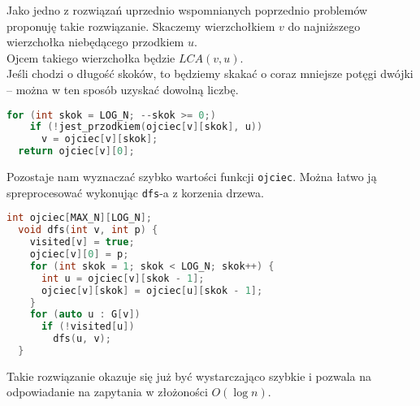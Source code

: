 \documentclass[../main.tex]{subfiles}
\begin{document}
\begin{frame}[fragile]{\subsecname}
Jako jedno z rozwiązań uprzednio wspomnianych poprzednio problemów proponuję takie rozwiązanie.
Skaczemy wierzchołkiem $v$ do najniższego wierzchołka niebędącego przodkiem $u$.\\
Ojcem takiego wierzchołka będzie $LCA(v, u)$.\\
Jeśli chodzi o długość skoków, to będziemy skakać o coraz mniejsze potęgi dwójki -- można w ten sposób uzyskać dowolną liczbę.
\pause

\begin{block}{}
\begin{lstlisting}[language=C++]
  for (int skok = LOG_N; --skok >= 0;)
    if (!jest_przodkiem(ojciec[v][skok], u))
      v = ojciec[v][skok];
  return ojciec[v][0];
\end{lstlisting}
\end{block}

\end{frame}

\begin{frame}[fragile]{\subsecname}
Pozostaje nam wyznaczać szybko wartości funkcji \lstinline{ojciec}.\pause
Można łatwo ją spreprocesować wykonując \lstinline{dfs}-a z korzenia drzewa.

\begin{block}{}
\begin{lstlisting}[language=C++]
  int ojciec[MAX_N][LOG_N];
  void dfs(int v, int p) {
    visited[v] = true;
    ojciec[v][0] = p;
    for (int skok = 1; skok < LOG_N; skok++) {
      int u = ojciec[v][skok - 1];
      ojciec[v][skok] = ojciec[u][skok - 1];
    }
    for (auto u : G[v])
      if (!visited[u])
        dfs(u, v);
  }
\end{lstlisting}
\end{block}
\pause
Takie rozwiązanie okazuje się już być wystarczająco szybkie i pozwala na odpowiadanie na zapytania w złożoności $O(\log{n})$.

\end{frame}
\end{document}
